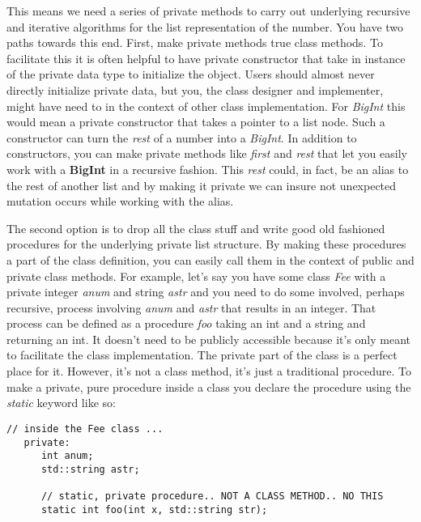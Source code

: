 \documentclass[10pt]{article}
\begin{document}
This means we need a series of private methods to carry out underlying recursive and iterative algorithms for the list representation of the number. You have two paths towards this end. First, make private methods true class methods.  To facilitate this it is often helpful to have private constructor that take in instance of the private data type to initialize the object. Users should almost never directly initialize private data, but you, the class designer and implementer, might have need to in the context of other class implementation. For \textit{BigInt} this would mean a private constructor that takes a pointer to a list node. Such a constructor can turn the \textit{rest} of a number into a \textit{BigInt}. In addition to constructors, you can make private methods like \textit{first} and \textit{rest} that let you easily work with a \textbf{BigInt} in a recursive fashion. This \textit{rest} could, in fact, be an alias to the rest of another list and by making it private we can insure not unexpected mutation occurs while working with the alias.

The second option is to drop all the class stuff and write good old fashioned procedures for the underlying private list structure. By making these procedures a part of the class definition, you can easily call them in the context of public and private class methods. For example, let's say you have some class \textit{Fee} with a private integer \textit{anum} and string \textit{astr} and you need to do some involved, perhaps recursive, process involving \textit{anum} and \textit{astr} that results in an integer. That process can be defined as a procedure \textit{foo} taking an int and a string and returning an int. It doesn't need to be publicly accessible because it's only meant to facilitate the class implementation. The private part of the class is a perfect place for it. However, it's not a class method, it's just a traditional procedure. To make a private, pure procedure inside a class you declare the procedure using the \textit{static} keyword like so:
\begin{verbatim}
// inside the Fee class ...
   private:
      int anum;
      std::string astr;

      // static, private procedure.. NOT A CLASS METHOD.. NO THIS
      static int foo(int x, std::string str);
\end{verbatim}
\end{document}
